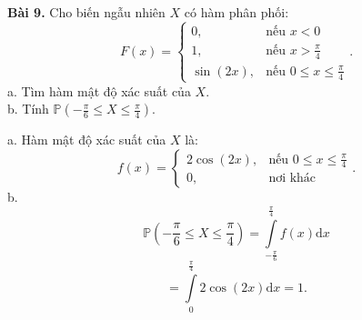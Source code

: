 \documentclass[12pt,a4paper]{article}
\begin{document}
\begin{mybox}
    \textbf{Bài 9.} Cho biến ngẫu nhiên $X$ có hàm phân phối:
    $$F \left( x \right) = 
    \begin{cases}
        0, &\text{nếu } x < 0\\
        1, &\text{nếu } x > \frac{\pi}{4}\\
        \sin \left( {2x} \right), &\text{nếu } 0 \leqslant x \leqslant \frac{\pi}{4}
    \end{cases}
    .$$
    a. Tìm hàm mật độ xác suất của $X.$\\
    b. Tính $\mathbb{P} \left( {-\frac{\pi}{6} \leqslant X \leqslant \frac{\pi}{4}}\right)$.
\end{mybox}
a. Hàm mật độ xác suất của $X$ là:
$$f \left( x \right) = 
    \begin{cases}
        2 \cos \left( {2x} \right), &\text{nếu } 0 \leqslant x \leqslant \frac{\pi}{4}\\
        0, &\text{nơi khác }
        
    \end{cases}
    .$$
b. $$\mathbb{P} \left( {-\frac{\pi}{6} \leqslant X \leqslant \frac{\pi}{4}}\right) = \int\limits_{-\frac{\pi}{6}}^{\frac{\pi}{4}}{f \left( x \right) \mathrm{d}x}$$
$$ = \int\limits_{0}^{\frac{\pi}{4}}{2 \cos \left( {2x} \right)\mathrm{d}x}  = 1.$$
\end{document}
